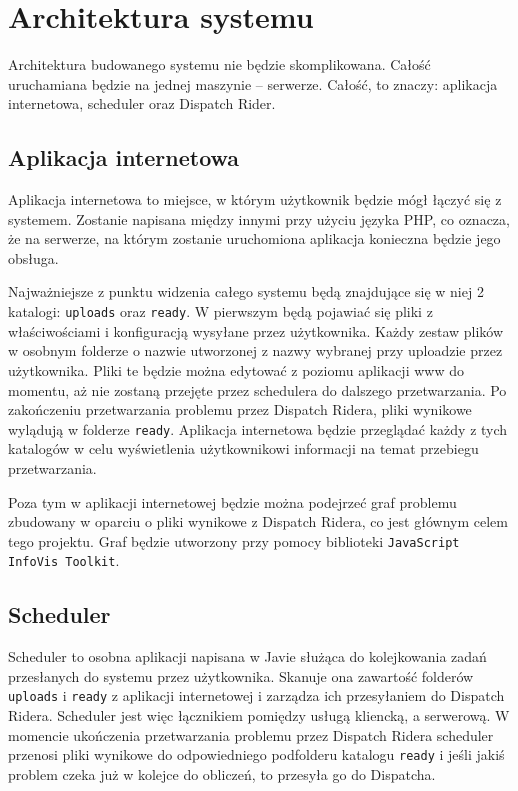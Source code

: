 \chapter{Architektura systemu}
Architektura budowanego systemu nie będzie skomplikowana. Całość uruchamiana
będzie na jednej maszynie -- serwerze. Całość, to znaczy: aplikacja internetowa, scheduler
oraz Dispatch Rider.
\section{Aplikacja internetowa}
Aplikacja internetowa to miejsce, w którym użytkownik będzie mógł łączyć się z systemem.
Zostanie napisana między innymi przy użyciu języka PHP, co oznacza, że na serwerze,
na którym zostanie uruchomiona aplikacja konieczna będzie jego obsługa.

Najważniejsze z punktu widzenia całego systemu będą znajdujące się w niej 2 katalogi: \texttt{uploads}
oraz \texttt{ready}. W pierwszym będą pojawiać się pliki z właściwościami i konfiguracją wysyłane przez 
użytkownika. Każdy zestaw plików w osobnym folderze o nazwie utworzonej z nazwy wybranej przy uploadzie
przez użytkownika. Pliki te będzie można edytować z poziomu aplikacji www do momentu, aż nie zostaną
przejęte przez schedulera do dalszego przetwarzania. Po zakończeniu przetwarzania problemu przez Dispatch
Ridera, pliki wynikowe wylądują w folderze \texttt{ready}. Aplikacja internetowa będzie przeglądać
każdy z tych katalogów w celu wyświetlenia użytkownikowi informacji na temat przebiegu przetwarzania.

Poza tym w aplikacji internetowej będzie można podejrzeć graf problemu zbudowany w oparciu o pliki
wynikowe z Dispatch Ridera, co jest głównym celem tego projektu. Graf będzie utworzony przy pomocy
biblioteki \texttt{JavaScript InfoVis Toolkit}.

\section{Scheduler}
Scheduler to osobna aplikacji napisana w Javie służąca do kolejkowania zadań przesłanych do systemu
przez użytkownika. Skanuje ona zawartość folderów \texttt{uploads} i \texttt{ready} z aplikacji internetowej
i zarządza ich przesyłaniem do Dispatch Ridera. Scheduler jest więc łącznikiem pomiędzy usługą kliencką,
a serwerową. W momencie ukończenia przetwarzania problemu przez Dispatch Ridera scheduler przenosi pliki
wynikowe do odpowiedniego podfolderu katalogu \texttt{ready} i jeśli jakiś problem czeka już w kolejce
do obliczeń, to przesyła go do Dispatcha.

